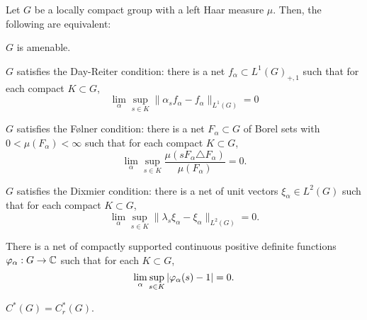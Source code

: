 \documentclass{../../../small}
\begin{document}
\begin{thm}
Let $G$ be a locally compact group with a left Haar measure $\mu$.
Then, the following are equivalent:
\begin{parts}
\item $G$ is amenable.
\item $G$ satisfies the Day-Reiter condition: there is a net $f_\alpha\subset L^1(G)_{+,1}$ such that for each compact $K\subset G$,
\[\lim_\alpha\sup_{s\in K}\|\alpha_sf_\alpha-f_\alpha\|_{L^1(G)}=0\]
\item $G$ satisfies the F\o lner condition: there is a net $F_\alpha\subset G$ of Borel sets with $0<\mu(F_\alpha)<\infty$ such that for each compact $K\subset G$,
\[\lim_\alpha\sup_{s\in K}\frac{\mu(sF_\alpha\triangle F_\alpha)}{\mu(F_\alpha)}=0.\]
\item $G$ satisfies the Dixmier condition: there is a net of unit vectors $\xi_\alpha\in L^2(G)$ such that for each compact $K\subset G$,
\[\lim_\alpha\sup_{s\in K}\|\lambda_s\xi_\alpha-\xi_\alpha\|_{L^2(G)}=0.\]
\item There is a net of compactly supported continuous positive definite functions $\varphi_\alpha:G\to\mathbb{C}$ such that for each $K\subset G$,
\[\lim_\alpha\sup_{s\in K}|\varphi_\alpha(s)-1|=0.\]
\item $C^*(G)=C_r^*(G)$.
\end{parts}
\end{thm}
\end{document}
